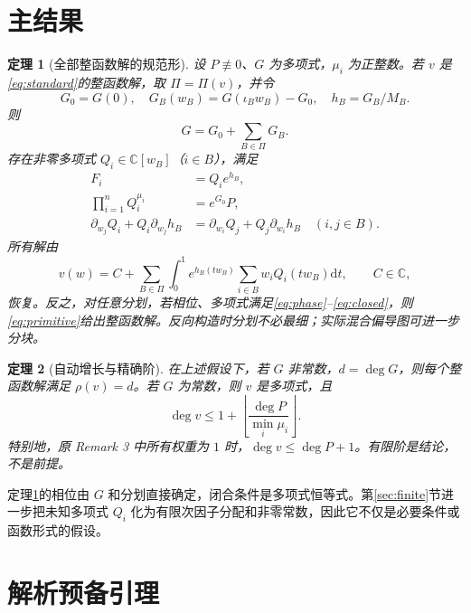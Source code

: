 \documentclass[UTF8,11pt,a4paper,fontset=fandol]{ctexart}
\newtheorem{theorem}{定理}[section]
\theoremstyle{definition}\newtheorem{definition}[theorem]{定义}
\theoremstyle{remark}\newtheorem{remark}[theorem]{注}
\newcommand{\C}{\mathbb C}\newcommand{\N}{\mathbb N}
\newcommand{\dd}{\mathrm d}\newcommand{\OO}{\mathcal O}
\begin{document}
\section{主结果}
\begin{theorem}[全部整函数解的规范形]\label{thm:normal}
设 $P\not\equiv0$、$G$ 为多项式，$\mu_i$ 为正整数。若 $v$ 是\eqref{eq:standard}的整函数解，取 $\Pi=\Pi(v)$，并令
\begin{equation}\label{eq:phase}
G_0=G(0),\quad G_B(w_B)=G(\iota_Bw_B)-G_0,\quad h_B=G_B/M_B.
\end{equation}
则
\begin{equation}\label{eq:split}
G=G_0+\sum_{B\in\Pi}G_B.
\end{equation}
存在非零多项式 $Q_i\in\C[w_B]$（$i\in B$），满足
\begin{align}
F_i&=Q_i e^{h_B},\label{eq:gradient}\\
\prod_{i=1}^n Q_i^{\mu_i}&=e^{G_0}P,\label{eq:product}\\
\partial_{w_j}Q_i+Q_i\partial_{w_j}h_B
&=\partial_{w_i}Q_j+Q_j\partial_{w_i}h_B\quad(i,j\in B).\label{eq:closed}
\end{align}
所有解由
\begin{equation}\label{eq:primitive}
v(w)=C+\sum_{B\in\Pi}\int_0^1
 e^{h_B(tw_B)}\sum_{i\in B}w_iQ_i(tw_B)\dd t,\qquad C\in\C,
\end{equation}
恢复。反之，对任意分划，若相位、多项式满足\eqref{eq:phase}--\eqref{eq:closed}，则\eqref{eq:primitive}给出整函数解。反向构造时分划不必最细；实际混合偏导图可进一步分块。
\end{theorem}

\begin{theorem}[自动增长与精确阶]\label{thm:growth}
在上述假设下，若 $G$ 非常数，$d=\deg G$，则每个整函数解满足 $\rho(v)=d$。若 $G$ 为常数，则 $v$ 是多项式，且
\begin{equation}\label{eq:degree}
\deg v\le 1+\left\lfloor\frac{\deg P}{\min_i\mu_i}\right\rfloor.
\end{equation}
特别地，原 Remark 3 中所有权重为 $1$ 时，$\deg v\le\deg P+1$。有限阶是结论，不是前提。
\end{theorem}

定理\ref{thm:normal}的相位由 $G$ 和分划直接确定，闭合条件是多项式恒等式。第\ref{sec:finite}节进一步把未知多项式 $Q_i$ 化为有限次因子分配和非零常数，因此它不仅是必要条件或函数形式的假设。

\section{解析预备引理}
\end{document}
